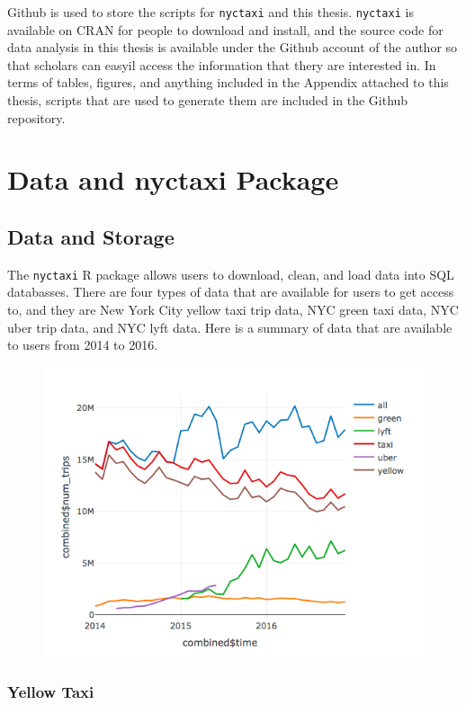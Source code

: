 \documentclass[12pt,twoside]{reedthesis}
\theoremstyle{definition}
\theoremstyle{definition}
\theoremstyle{definition}
\theoremstyle{remark}
\begin{document}
Github is used to store the scripts for \texttt{nyctaxi} and this
thesis. \texttt{nyctaxi} is available on CRAN for people to download and
install, and the source code for data analysis in this thesis is
available under the Github account of the author so that scholars can
easyil access the information that thery are interested in. In terms of
tables, figures, and anything included in the Appendix attached to this
thesis, scripts that are used to generate them are included in the
Github repository.

\chapter{Data and nyctaxi Package}\label{chapter1}

\section{Data and Storage}\label{data-and-storage}

The \texttt{nyctaxi} R package allows users to download, clean, and load
data into SQL databasses. There are four types of data that are
available for users to get access to, and they are New York City yellow
taxi trip data, NYC green taxi data, NYC uber trip data, and NYC lyft
data. Here is a summary of data that are available to users from 2014 to
2016.
\begin{figure}
\centering
\includegraphics{figure/Num_trips_summary.png}
\caption{}
\end{figure}
\subsection{Yellow Taxi}\label{yellow-taxi-1}
\end{document}

